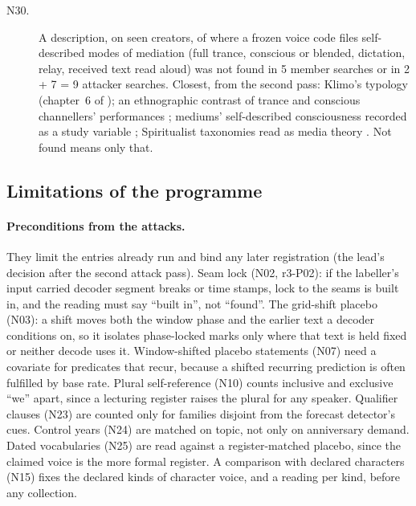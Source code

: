 {\begin{description}
\item[N30.] A description, on seen creators, of where a frozen voice code files self-described modes of mediation (full
trance, conscious or blended, dictation, relay, received text read aloud) was not found in 5 member searches or in
2 + 7 = 9 attacker searches. Closest, from the second pass: Klimo's typology (chapter~6 of
\citealt{klimo1987channeling}); an ethnographic contrast of trance and conscious channellers' performances
\cite{brown1997channeling}; mediums' self-described consciousness recorded as a study variable
\cite{p12spindolarodrigues2022cognitive}; Spiritualist taxonomies read as media theory \cite{p12vanreenen2026spiritualist}.
Not found means only that.
\end{description}
}

\subsection{Limitations of the programme}
\label{app:panel3-limits}

\paragraph{Preconditions from the attacks.} They limit the entries already run and bind any later registration (the
lead's decision after the second attack pass). Seam lock (N02, r3-P02): if the labeller's input carried decoder segment breaks or time stamps,
lock to the seams is built in, and the reading must say ``built in'', not ``found''. The grid-shift placebo (N03): a
shift moves both the window phase and the earlier text a decoder conditions on, so it isolates phase-locked marks only
where that text is held fixed or neither decode uses it. Window-shifted placebo
statements (N07) need a covariate for predicates that recur, because a shifted recurring prediction is often fulfilled
by base rate. Plural self-reference (N10) counts inclusive and exclusive ``we'' apart, since a lecturing register raises
the plural for any speaker. Qualifier clauses (N23) are counted only for families disjoint from the forecast detector's
cues. Control years (N24) are matched on topic, not only on anniversary demand. Dated vocabularies (N25) are read
against a register-matched placebo, since the claimed voice is the more formal register. A comparison with declared
characters (N15) fixes the declared kinds of character voice, and a reading per kind, before any collection.

